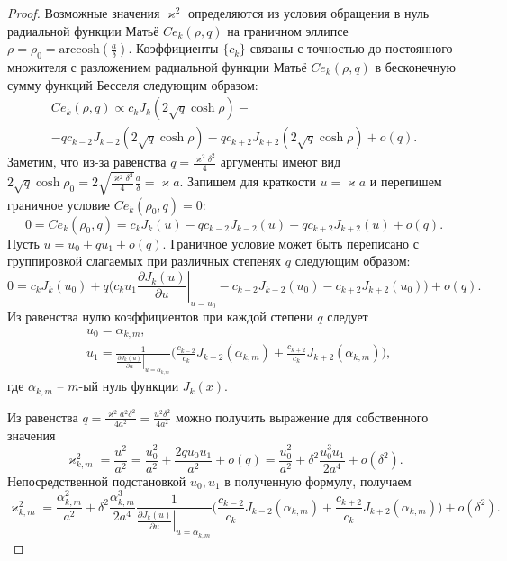 \begin{proof}
Возможные значения $\varkappa^2$ определяются из условия обращения в нуль радиальной функции Матьё $Ce_k(\rho, q)$ на граничном эллипсе $\rho = \rho_0 = \text{arccosh} (\frac{a}{\delta})$.
Коэффициенты $\{c_k\}$ связаны \cite{wref2} с точностью до постоянного множителя с разложением радиальной функции Матьё $Ce_k(\rho, q)$ в бесконечную сумму функций Бесселя следующим образом:
\begin{multline*}
Ce_k(\rho, q) \propto 
	c_k J_k(2\sqrt{q}\cosh{\rho}) - \\
	- q c_{k-2} J_{k-2}(2\sqrt{q}\cosh{\rho}) -
	q c_{k+2} J_{k+2}(2\sqrt{q}\cosh{\rho}) + o(q).
\end{multline*}
Заметим, что из-за равенства $q = \frac{\varkappa^2\delta^2}{4}$ аргументы имеют вид $2 \sqrt{q} \cosh{\rho_0} = 2 \sqrt{\frac{\varkappa^2 \delta^2}{4}} \frac{a}{\delta} = \varkappa a$. 
Запишем для краткости $u = \varkappa a$ и перепишем граничное условие $Ce_k(\rho_0, q) = 0$:
$$0 = Ce_k(\rho_0, q) =
	c_k J_k(u) 
	- q c_{k-2} J_{k-2}(u) -
	q c_{k+2} J_{k+2}(u) + o(q).$$
Пусть $u = u_0 + q u_1 + o(q)$. Граничное условие может быть переписано с группировкой слагаемых при различных степенях $q$ следующим образом:
$$0 =
	c_k J_k(u_0) + q \biggl(
	c_k u_1 \left.\frac{\partial  J_k(u)}{\partial u}\right|_{u=u_0}
	-  c_{k-2} J_{k-2}(u_0) - c_{k+2} J_{k+2}(u_0) 
	\biggr)+ o(q).$$
Из равенства нулю коэффициентов при каждой степени $q$ следует
\begin{align*}
&u_0 = \alpha_{k, m}, \\
&u_1 = \frac{1}{\left.\frac{\partial J_{k} (u)}{\partial u}\right|_{u=\alpha_{k, m}}} 
\biggl(
\frac{c_{k-2}}{c_k} J_{k-2}(\alpha_{k, m}) + \frac{c_{k+2} }{c_k} J_{k+2}(\alpha_{k, m})
\biggr),
\end{align*}
где $\alpha_{k, m}$ -- $m$-ый нуль функции $J_k(x)$.  

Из равенства $q=\frac{\varkappa^2 a^2 \delta^2}{4 a^2}=\frac{u^2 \delta^2}{4a^2}$ можно получить выражение для собственного значения
$$\varkappa_{k, m}^2 = \frac{u^2}{a^2} = \frac{u_0^2}{a^2} + \frac{2 q u_0 u_1}{a^2} + o(q)= \frac{u_0^2}{a^2} +  \delta^2 \frac{u_0^3 u_1}{2 a^4} + o(\delta^2).$$ 
Непосредственной подстановкой $u_0, u_1$ в полученную формулу, получаем
$$\varkappa_{k, m}^2 = 
\frac{\alpha_{k, m}^2}{a^2} +  \delta^2 \frac{\alpha_{k, m}^3}{2 a^4}\frac{1}{\left.\frac{\partial J_{k} (u)}{\partial u}\right|_{u=\alpha_{k, m}}} 
\biggl(
\frac{c_{k-2}}{c_k} J_{k-2}(\alpha_{k, m}) + \frac{c_{k+2} }{c_k} J_{k+2}(\alpha_{k, m})
\biggr) + o(\delta^2).
$$ 
\end{proof}

